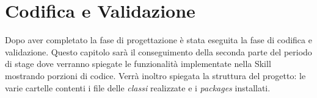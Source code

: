 
\chapter{Codifica e Validazione}
\label{cap:codifica_validazione}
Dopo aver completato la fase di progettazione è stata eseguita la fase di codifica e validazione. Questo capitolo sarà il conseguimento della seconda parte del periodo di stage dove verranno spiegate le funzionalità implementate nella Skill mostrando porzioni di codice. Verrà inoltro spiegata la struttura del progetto: le varie cartelle contenti i file delle \textit{classi} realizzate e i \textit{packages} installati. 

